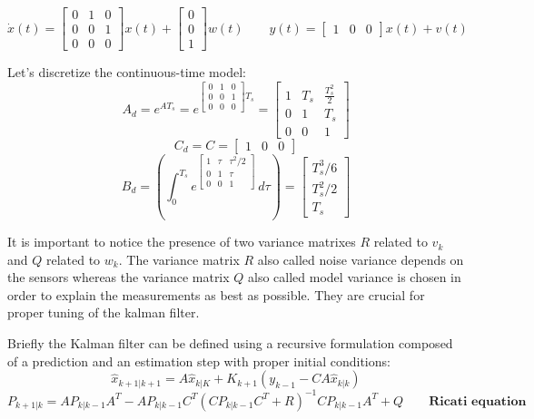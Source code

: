 \documentclass[a4paper,12pt]{article}
\begin{document}
\begin{equation}
    \dot{x}(t) =  \begin{bmatrix}  0&1&0 \\ 0&0&1\\0&0&0 \end{bmatrix} x(t) + \begin{bmatrix}  0\\0\\1 \end{bmatrix} w(t)
    \qquad
    y(t) = \begin{bmatrix}  1&0&0 \end{bmatrix}x(t) + v(t)
\end{equation}

\noindent Let's discretize the continuous-time model:
\[
    A_d = e^{AT_s} = e^{\begin{bmatrix}  0&1&0 \\ 0&0&1\\0&0&0 \end{bmatrix}T_s} = \begin{bmatrix} 1&T_s&\frac{T_s^2}{2}\\0&1&T_s\\0&0&1 \end{bmatrix}
\]
\[
    C_d = C = \begin{bmatrix} 1&0&0 \end{bmatrix}
\]
\[
    B_d = \left (\int_{0}^{T_s} e^{\begin{bmatrix} 1&\tau&\tau^2/2\\0&1&\tau\\0&0&1 \end{bmatrix}} \,d\tau \right) = \begin{bmatrix} T_s^3/6\\T_s^2/2\\T_s \end{bmatrix}
\]

It is important to notice the presence of two variance matrixes $R$ related to $v_k$ and $Q$ related to $w_k$. The variance matrix $R$ also called noise variance depends on the sensors whereas the variance
matrix $Q$ also called model variance is chosen in order to explain the measurements as best as
possible. They are crucial for proper tuning of the kalman filter.

\bigskip
\noindent Briefly the Kalman filter can be defined using a recursive formulation composed of a prediction and an estimation step with proper initial conditions:
\[
    \hat{x}_{k+1|k+1} = A\hat{x}_{k|K} + K_{k+1}(y_{k-1} - CA\hat{x}_{k|k})
\]   
\[
    P_{k+1|k} = AP_{k|k-1}A^T - AP_{k|k-1}C^T(CP_{k|k-1}C^T + R)^{-1}CP_{k|k-1}A^T+Q \qquad \textbf{Ricati equation}
\]
\end{document}
